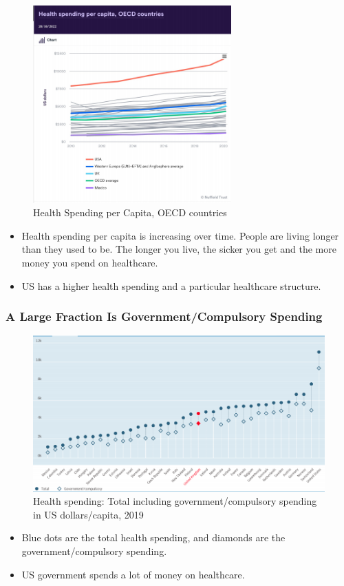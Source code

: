             \begin{figure}[H]
                \centering
                \includegraphics[width=3in]{images/ch3/1 Health spending OECD.png}
                \caption{Health Spending per Capita, OECD countries}
            \end{figure}
            \begin{itemize}
                \item Health spending per capita is increasing over time. People are living longer than they used to be. The longer you live, the sicker you get and the more money you spend on healthcare. 
                \item US has a higher health spending and a particular healthcare structure.
            \end{itemize}
        
        \subsubsection{A Large Fraction Is Government/Compulsory Spending}
            \begin{figure}[H]
                \centering
                \includegraphics[width=5in]{images/ch3/2 Government.png}
                \caption{Health spending: Total including government/compulsory spending in US dollars/capita, 2019}
            \end{figure}      
            \begin{itemize}
                \item Blue dots are the total health spending, and diamonds are the government/compulsory spending. 
                \item US government spends a lot of money on healthcare.
            \end{itemize}
        
